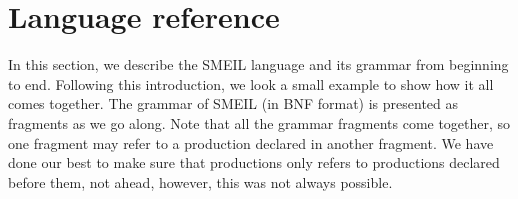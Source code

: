 



\section{Language reference}
\label{sec:langref}
In this section, we describe the SMEIL language and its grammar from beginning
to end. Following this introduction, we look a small example to show how it all
comes together. The grammar of SMEIL (in BNF format) is presented as fragments
as we go along. Note that all the grammar fragments come together, so one
fragment may refer to a production declared in another fragment. We have done
our best to make sure that productions only refers to productions declared
before them, not ahead, however, this was not always possible.




